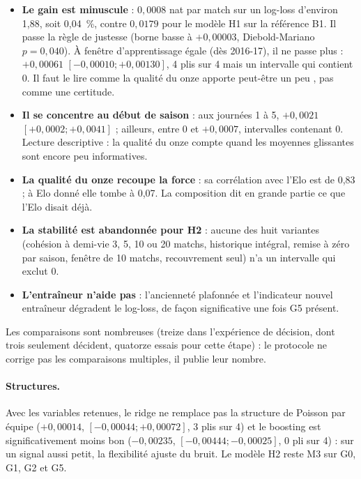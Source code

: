 \begin{itemize}
  \item \textbf{Le gain est minuscule} : \(0{,}0008\) nat par match sur un log-loss d'environ 1,88, soit
        0,04~\%, contre \(0{,}0179\) pour le modèle H1 sur la référence B1. Il passe la règle de justesse
        (borne basse à \(+0{,}00003\), Diebold-Mariano \(p = 0{,}040\)). À fenêtre d'apprentissage égale
        (dès 2016-17), il ne passe plus : \(+0{,}00061\) \([-0{,}00010 ; +0{,}00130]\), 4 plis sur 4 mais
        un intervalle qui contient 0. Il faut le lire comme \og la qualité du onze apporte peut-être un
        peu \fg{}, pas comme une certitude.
  \item \textbf{Il se concentre au début de saison} : aux journées 1 à 5, \(+0{,}0021\)
        \([+0{,}0002 ; +0{,}0041]\) ; ailleurs, entre 0 et \(+0{,}0007\), intervalles contenant 0. Lecture
        descriptive : la qualité du onze compte quand les moyennes glissantes sont encore peu informatives.
  \item \textbf{La qualité du onze recoupe la force} : sa corrélation avec l'Elo est de 0,83 ; à Elo donné
        elle tombe à 0,07. La composition dit en grande partie ce que l'Elo disait déjà.
  \item \textbf{La stabilité est abandonnée pour H2} : aucune des huit variantes (cohésion à demi-vie 3,
        5, 10 ou 20 matchs, historique intégral, remise à zéro par saison, fenêtre de 10 matchs,
        recouvrement seul) n'a un intervalle qui exclut 0.
  \item \textbf{L'entraîneur n'aide pas} : l'ancienneté plafonnée et l'indicateur \og nouvel entraîneur
        \fg{} dégradent le log-loss, de façon significative une fois G5 présent.
\end{itemize}

Les comparaisons sont nombreuses (treize dans l'expérience de décision, dont trois seulement décident,
quatorze essais pour cette étape) : le protocole ne corrige pas les comparaisons multiples, il publie leur
nombre.

\paragraph{Structures.} Avec les variables retenues, le ridge ne remplace pas la structure de Poisson par
équipe (\(+0{,}00014\), \([-0{,}00044 ; +0{,}00072]\), 3 plis sur 4) et le boosting est significativement
moins bon (\(-0{,}00235\), \([-0{,}00444 ; -0{,}00025]\), 0 pli sur 4) : sur un signal aussi petit, la
flexibilité ajuste du bruit. Le modèle H2 reste M3 sur G0, G1, G2 et G5.


